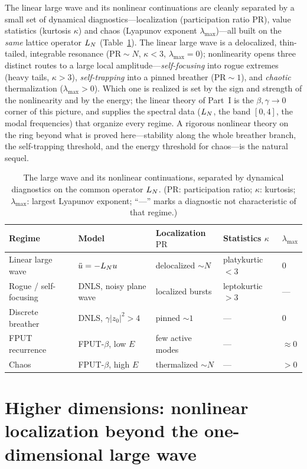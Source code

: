 The linear large wave and its nonlinear continuations are cleanly separated by a small set of dynamical
diagnostics---localization (participation ratio $\mathrm{PR}$), value statistics (kurtosis $\kappa$) and chaos
(Lyapunov exponent $\lambda_{\max}$)---all built on the \emph{same} lattice operator $L_N$
(Table~\ref{tab:diagnostics}). The linear large wave is a delocalized, thin-tailed, integrable resonance
($\mathrm{PR}\sim N$, $\kappa<3$, $\lambda_{\max}=0$); nonlinearity opens three distinct routes to a large local
amplitude---\emph{self-focusing} into rogue extremes (heavy tails, $\kappa>3$), \emph{self-trapping} into
a pinned breather ($\mathrm{PR}\sim1$), and \emph{chaotic} thermalization ($\lambda_{\max}>0$). Which one is
realized is set by the sign and strength of the nonlinearity and by the energy; the linear theory of
Part~I is the $\beta,\gamma\to0$ corner of this picture, and supplies the spectral data ($L_N$, the band
$[0,4]$, the modal frequencies) that organize every regime. A rigorous nonlinear theory on the ring beyond
what is proved here---stability along the whole breather branch, the self-trapping threshold, and the energy
threshold for chaos---is the natural sequel.

\begin{table}[ht]\centering
\caption{The large wave and its nonlinear continuations, separated by dynamical diagnostics on the common
operator $L_N$. ($\mathrm{PR}$: participation ratio; $\kappa$: kurtosis; $\lambda_{\max}$: largest Lyapunov
exponent; ``---'' marks a diagnostic not characteristic of that regime.)}\label{tab:diagnostics}
\begin{tabular}{lllll}
\hline
Regime & Model & Localization $\mathrm{PR}$ & Statistics $\kappa$ & $\lambda_{\max}$\\
\hline
Linear large wave & $\ddot u=-L_N u$ & delocalized $\sim N$ & platykurtic $<3$ & $0$\\
Rogue / self-focusing & DNLS, noisy plane wave & localized bursts & leptokurtic $>3$ & ---\\
Discrete breather & DNLS, $\gamma|z_0|^2>4$ & pinned $\sim1$ & --- & $0$\\
FPUT recurrence & FPUT-$\beta$, low $E$ & few active modes & --- & $\approx0$\\
Chaos & FPUT-$\beta$, high $E$ & thermalized $\sim N$ & --- & $>0$\\
\hline
\end{tabular}
\end{table}

\section{Higher dimensions: nonlinear localization beyond the one-dimensional large wave}\label{sec:highd}

